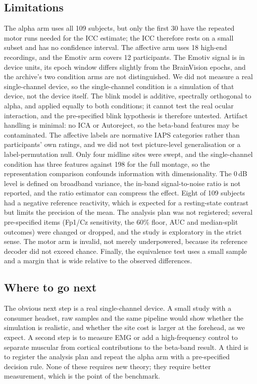 \subsection*{Limitations}
The alpha arm uses all 109 subjects, but only the first 30 have the repeated motor runs
needed for the ICC estimate; the ICC therefore rests on a small subset and has no
confidence interval. The affective arm uses 18 high-end recordings, and the Emotiv arm
covers 12 participants. The Emotiv signal is in device units, its epoch window differs
slightly from the BrainVision epochs, and the archive's two condition arms are not
distinguished. We did not measure a real single-channel device, so the single-channel
condition is a simulation of that device, not the device itself. The blink model is
additive, spectrally orthogonal to alpha, and applied equally to both conditions; it
cannot test the real ocular interaction, and the pre-specified blink hypothesis is
therefore untested. Artifact handling is minimal: no ICA or Autoreject, so the beta-band
features may be contaminated. The affective labels are normative IAPS categories rather
than participants' own ratings, and we did not test picture-level generalisation or a
label-permutation null. Only four midline sites were swept, and the single-channel
condition has three features against 198 for the full montage, so the representation
comparison confounds information with dimensionality. The 0\,dB level is defined on
broadband variance, the in-band signal-to-noise ratio is not reported, and the ratio
estimator can compress the effect. Eight of 109 subjects had a negative reference
reactivity, which is expected for a resting-state contrast but limits the precision of
the mean. The analysis plan was not registered; several pre-specified items (Fp1/Cz
sensitivity, the 60\% floor, AUC and median-split outcomes) were changed or dropped, and
the study is exploratory in the strict sense. The motor arm is invalid, not merely
underpowered, because its reference decoder did not exceed chance. Finally, the
equivalence test uses a small sample and a margin that is wide relative to the observed
differences.

\subsection*{Where to go next}
The obvious next step is a real single-channel device. A small study with a consumer
headset, raw samples and the same pipeline would show whether the simulation is
realistic, and whether the site cost is larger at the forehead, as we expect. A second
step is to measure EMG or add a high-frequency control to separate muscular from
cortical contributions to the beta-band result. A third is to register the analysis
plan and repeat the alpha arm with a pre-specified decision rule. None of these requires
new theory; they require better measurement, which is the point of the benchmark.
